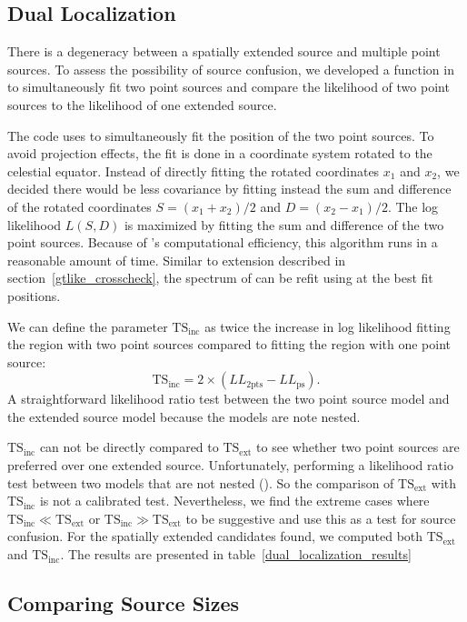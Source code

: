 \documentclass[12pt,preprint]{aastex}
\newcommand{\tsext}{{\ensuremath{\text{TS}_\text{ext}}}\xspace}
\newcommand{\tsinc}{\ensuremath{\text{TS}_\text{inc}}\xspace}
\newcommand{\pointlike}{\text{\em pointlike}\xspace}
\newcommand{\gtlike}{\text{\em gtlike}\xspace}
\newcommand{\minuit}{\text{\em Minuit}\xspace}
\begin{document}
\subsection{Dual Localization}
\label{dual_localization_method}

There is a degeneracy between a spatially extended source and multiple
point sources.  To assess the possibility of source confusion,
we developed a function in \pointlike to simultaneously fit two point
sources and compare the likelihood of two point sources to the likelihood
of one extended source.

The code uses \minuit to simultaneously fit the position of the two point
sources.  To avoid projection effects, the fit is done in a coordinate
system rotated to the celestial equator.  Instead of directly fitting
the rotated coordinates $x_1$ and $x_2$, we decided there would be less
covariance by fitting instead the sum and difference of the rotated
coordinates $S=(x_1+x_2)/2$ and $D=(x_2-x_1)/2$.  The log likelihood
$L(S,D)$ is maximized by fitting the sum and difference of the two point
sources.  Because of \pointlike's computational efficiency, this algorithm
runs in a reasonable amount of time. Similar to extension described in
section~\ref{gtlike_crosscheck}, the spectrum of can be refit using \gtlike
at the best fit positions.

We can define the parameter \tsinc as twice the increase in log likelihood
fitting the region with two point sources compared to fitting the region
with one point source:
\begin{equation}
  \tsinc=2\times(LL_\text{2pts}-LL_\text{ps}).
\end{equation}
A straightforward likelihood ratio test between the two point source
model and the extended source model because the models are note nested.

\tsinc can not be directly compared to \tsext to see whether two
point sources are preferred over one extended source. Unfortunately,
performing a likelihood ratio test between two models that are not nested
(\cite{statistics_with_care}). So the comparison of \tsext with \tsinc is
not a calibrated test.  Nevertheless, we find the extreme cases where
$\tsinc \ll \tsext$ or $\tsinc\gg\tsext$ to be suggestive and use this
as a test for source confusion. For the spatially extended candidates
found, we computed both \tsext and \tsinc.  The results are presented
in table~\ref{dual_localization_results}

\subsection{Comparing Source Sizes}
\end{document}
